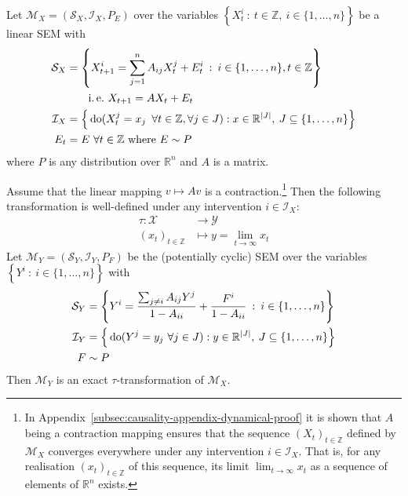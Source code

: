 \medskip

\begin{theorem}\label{theorem:identical}
Let $\mathcal{M}_X = \left(\mathcal{S}_X, \mathcal{I}_X, P_{E} \right)$ over the variables ${\left\lbrace X_t^i \: : \: t \in \mathbb{Z}, \: i\in \{1,\ldots,n\} \right\rbrace}$ be a linear SEM with
%
\begin{align*}
\mathcal{S}_X &= \left\lbrace X_{t+1}^i = \sum_{j=1}^n A_{ij}X_t^j + E_t^i \:  : \: i \in \{1,\ldots,n\}, t\in\mathbb{Z} \right\rbrace \\
&\qquad\text{i.\,e.}\ X_{t+1} = AX_t + E_t \\
%
\mathcal{I}_X &= \Big{\{} \doop(X_t^j= x_j \enspace \forall t \in \mathbb{Z},\forall j \in J):  x \in \mathbb{R}^{|J|}, \: J \subseteq \{1,\ldots,n\} \Big{\}} \\
%
E_t &= E\ \forall t\in\mathbb{Z} \text{ where } E \sim P
\end{align*}
%
where $P$ is any distribution over $\mathbb{R}^n$ and $A$ is a matrix.

Assume that the linear mapping $v\mapsto Av$ is a contraction.\footnote{In Appendix~\ref{subsec:causality-appendix-dynamical-proof} it is shown that $A$ being a contraction mapping ensures that the sequence $(X_t)_{t\in\mathbb{Z}}$ defined by $\mathcal{M}_X$ converges everywhere under any intervention $i\in\mathcal{I}_X$. That is, for any realisation $(x_t)_{t\in\mathbb{Z}}$ of this sequence, its limit $\lim_{t\rightarrow \infty}x_t$ as a sequence of elements of $\mathbb{R}^n$ exists.}
Then the following transformation is well-defined under any intervention $i\in\mathcal{I}_X$:
%
\begin{align*}
\tau : \mathcal{X} &\rightarrow \mathcal{Y} \\
(x_t)_{t\in \mathbb{Z}} & \mapsto y= \lim_{t\rightarrow \infty} x_t
\end{align*}
%
Let ${\mathcal{M}_Y = \left(\mathcal{S}_Y, \mathcal{I}_Y, P_{F} \right)}$ be the (potentially cyclic) SEM over the variables ${\left\lbrace Y^i \: :  \: i\in \{1,\ldots,n\} \right\rbrace}$  with
%
\begin{align*}
\mathcal{S}_Y &= \left\lbrace Y^i = \frac{\sum_{j\not=i} A_{ij}Y^j}{1-A_{ii}} + \frac{F^i}{1-A_{ii}} \:  : \: i \in \{1,\ldots,n\} \right\rbrace \\
%
\mathcal{I}_Y &= \Big{\{} \doop(Y^j= y_j \ \forall j \in J) : y \in \mathbb{R}^{|J|}, \: J \subseteq \{1,\ldots,n\} \Big{\}} \\
%
F &\sim P
\end{align*}
%
Then $\mathcal{M}_Y$ is an exact $\tau$-transformation of $\mathcal{M}_X$.
\end{theorem}

